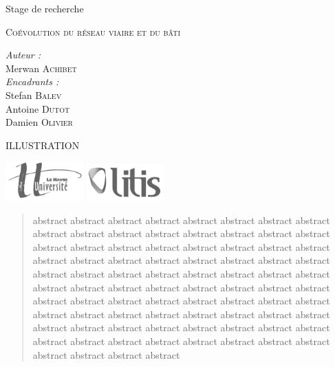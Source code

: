 \documentclass[12pt]{article}
\begin{document}
\begin{titlepage}

  Stage de recherche

  {\Large \textsc{Coévolution du réseau viaire et du bâti}}

  \begin{flushright}
    \textit{Auteur :}\\
    Merwan {\scshape Achibet}\\[0.5cm]
    \textit{Encadrants :}\\
    Stefan {\scshape Balev}\\
    Antoine {\scshape Dutot}\\
    Damien {\scshape Olivier}
  \end{flushright}

  \vfill

  \begin{center}
    ILLUSTRATION
  \end{center}

  \vfill

  \begin{center}
    \includegraphics[width=3cm]{images/logo-univ-le-havre.png}
    \qquad\qquad\qquad
    \includegraphics[width=3cm]{images/logo-litis.png}
  \end{center}

\end{titlepage}

\begin{abstract}
abstract abstract abstract abstract abstract abstract abstract
abstract abstract abstract abstract abstract abstract abstract
abstract abstract abstract abstract abstract abstract abstract
abstract abstract abstract abstract abstract abstract abstract
abstract abstract abstract abstract abstract abstract abstract
abstract abstract abstract abstract abstract abstract abstract
abstract abstract abstract abstract abstract abstract abstract
abstract abstract abstract abstract abstract abstract abstract
abstract abstract abstract abstract abstract abstract abstract
abstract abstract abstract abstract abstract abstract abstract
abstract abstract abstract abstract abstract abstract abstract
abstract abstract abstract abstract abstract abstract abstract
\end{abstract}
\end{document}
